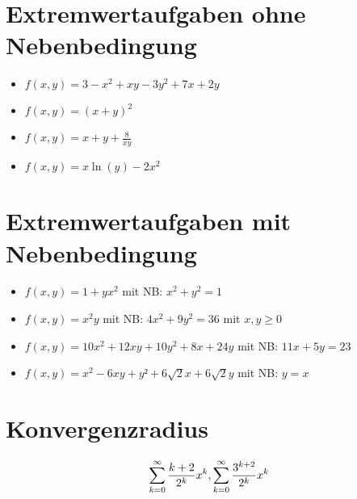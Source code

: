 \documentclass[ngerman,a4paper]{article}
\begin{document}
\section{Extremwertaufgaben ohne Nebenbedingung}
\begin{itemize}
	\item $f(x,y)=3-x^2+xy-3y^2+7x+2y$
	\item $f(x,y)=(x+y)^2$
	\item $f(x,y)=x+y+\frac{8}{xy}$
	\item $f(x,y)=x\ln(y)-2x^2$
\end{itemize}

\section{Extremwertaufgaben mit Nebenbedingung}
\begin{itemize}
	\item $f(x,y)=1+yx^2$ mit NB: $x^2+y^2=1$
	\item $f(x,y)=x^2y$ mit NB: $4x^2+9y^2=36$ mit $x,y\ge 0$
	\item $f(x,y)=10x^2+12xy+10y^2+8x+24y$ mit NB: $11x+5y=23$
	\item $f(x,y)=x^2-6xy+y²+6\sqrt{2}x+6\sqrt{2}y$ mit NB: $y=x$
\end{itemize}

\section{Konvergenzradius}
\begin{align}
	\sum_{k=0}^\infty \frac{k+2}{2^k}x^k,\sum_{k=0}^\infty\frac{3^{k+2}}{2^k}x^k\notag
\end{align}
\end{document}

